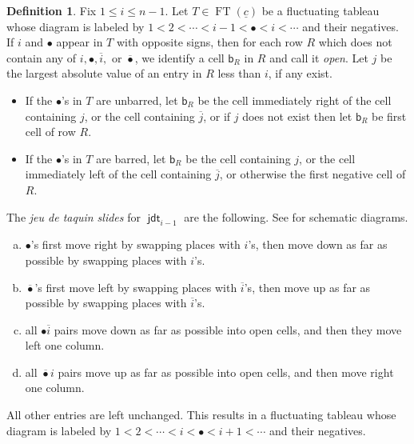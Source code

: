 \documentclass{amsart}
\theoremstyle{definition}
\newtheorem{definition}[theorem]{Definition}
\theoremstyle{remark}
\numberwithin{equation}{section}
\DeclareMathOperator{\ft}{FT}
\newcommand{\bbb}{\mathsf{b}}
\DeclareMathOperator{\JDT}{\mathsf{jdt}}
\begin{document}
\begin{definition}
      Fix $1 \leq i \leq n-1$. Let $T \in \ft(\underline{c})$ be a fluctuating tableau whose diagram is labeled by $1 < 2 < \cdots < i-1 < \bullet < i < \cdots$ and their negatives. 
 If $i$ and $\bullet$ appear in $T$ with opposite signs, then for each row $R$ which does not contain any of $i, \bullet, \overline{i},$ or $\overline{\bullet}$, we identify a cell $\bbb_R$ in $R$ and call it \emph{open}. Let $j$ be the largest absolute value of an entry in $R$ less than $i$, if any exist.
    \begin{itemize}
      \item[$\ast$] If the $\bullet$'s in $T$ are unbarred, let $\bbb_R$ be the cell immediately right of the cell containing $j$, or the cell containing $\overline{j}$, or if $j$ does not exist then let $\bbb_R$ be first cell of row $R$.
      \item[$\ast$] If the $\bullet$'s in $T$ are barred, let $\bbb_R$ be the cell containing $j$, or the cell immediately left of the cell containing $\overline{j}$, or otherwise the first negative cell of $R$.
    \end{itemize}

  The \emph{jeu de taquin slides} for $\JDT_{i-1}$ are the following. See \cite[Figure~4.2]{fluctuating-paper} for schematic diagrams.
  \begin{enumerate}[(a)]
  \item $\bullet$'s first move right by swapping places with $i$'s, then move down as far as possible by swapping places with $i$'s.
  \item $\overline{\bullet}$'s first move left by swapping places with $\overline{i}$'s, then move up as far as possible by swapping places with $\overline{i}$'s.
  \item all $\bullet\overline{i}$ pairs move down as far as possible into open cells, and then they move left one column.
  \item all $\overline{\bullet}i$ pairs move up as far as possible into open cells, and then move right one column.
  \end{enumerate}
  All other entries are left unchanged.     This results in a fluctuating tableau whose diagram is labeled by $1 < 2 < \cdots < i < \bullet < i+1 < \cdots$ and their negatives.
\end{definition}
\end{document}
